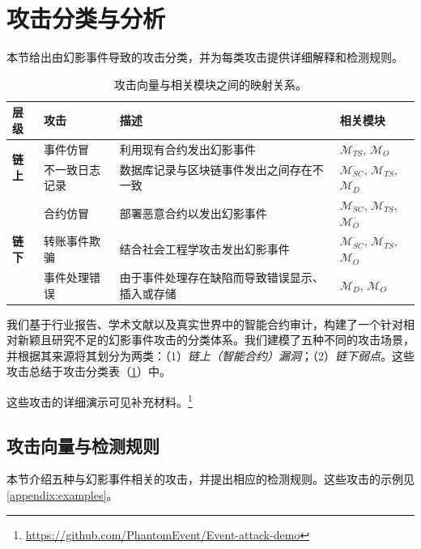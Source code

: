 \section{攻击分类与分析}\label{sec:vector}

本节给出由幻影事件导致的攻击分类，并为每类攻击提供详细解释和检测规则。

\begin{table}[ht]
\centering
\caption{攻击向量与相关模块之间的映射关系。}
\label{tab:attack-classification}
\begin{tabular}{l|l|p{8.5cm}|p{3cm}}
\toprule
\textbf{层级} & \textbf{攻击} & \textbf{描述} & \textbf{相关模块} \\
\midrule
\multirow{2}{*}{\textbf{链上}}
& 事件仿冒 & 利用现有合约发出幻影事件 & \(\bm{\mathcal{M}}_{TS}\), \(\bm{\mathcal{M}}_{O}\) \\
\cmidrule{2-4}
& 不一致日志记录 & 数据库记录与区块链事件发出之间存在不一致 & \(\bm{\mathcal{M}}_{SC}\), \(\bm{\mathcal{M}}_{TS}\), \(\bm{\mathcal{M}}_{D}\) \\
\midrule
\multirow{3}{*}{\textbf{链下}}
&合约仿冒 & 部署恶意合约以发出幻影事件 & \(\bm{\mathcal{M}}_{SC}\), \(\bm{\mathcal{M}}_{TS}\), \(\bm{\mathcal{M}}_{O}\) \\
\cmidrule{2-4}
& 转账事件欺骗 & 结合社会工程学攻击发出幻影事件 & \(\bm{\mathcal{M}}_{SC}\), \(\bm{\mathcal{M}}_{TS}\), \(\bm{\mathcal{M}}_{O}\) \\
\cmidrule{2-4}
& 事件处理错误 & 由于事件处理存在缺陷而导致错误显示、插入或存储 & \(\bm{\mathcal{M}}_{D}\), \(\bm{\mathcal{M}}_{O}\) \\
\bottomrule
\end{tabular}
\end{table}

我们基于行业报告、学术文献以及真实世界中的智能合约审计，构建了一个针对相对新颖且研究不足的幻影事件攻击的分类体系。我们建模了五种不同的攻击场景，并根据其来源将其划分为两类：（1）\emph{链上（智能合约）漏洞}；（2）\emph{链下弱点}。这些攻击总结于攻击分类表（\cref{tab:attack-classification}）中。

这些攻击的详细演示可见补充材料。\footnote{\url{https://github.com/PhantomEvent/Event-attack-demo}}


\subsection{攻击向量与检测规则}
本节介绍五种与幻影事件相关的攻击，并提出相应的检测规则。这些攻击的示例见\cref{appendix:examples}。

